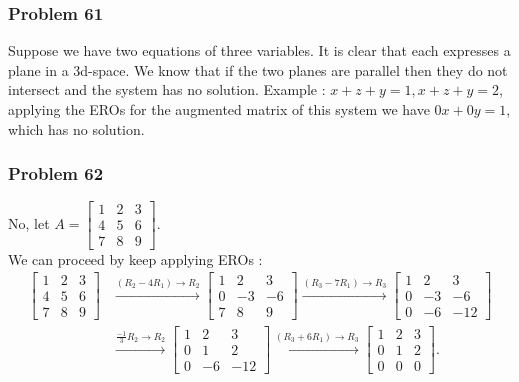 \documentclass[a4paper,12pt]{article}
\begin{document}
\subsubsection*{Problem 61}
Suppose we have two equations of three variables. It is clear that each expresses a plane in a 3d-space. We know that if the two planes are parallel then they do not intersect and the system has no solution. Example : $x+z+y=1, x+z+y=2$, applying the EROs for the augmented matrix of this system we have $0x+0y=1$, which has no solution.
\subsubsection*{Problem 62}
No, let $A=\begin{bmatrix}
  1 & 2 & 3 \\
  4 & 5 & 6 \\
  7 & 8 & 9
\end{bmatrix}.$\\
We can proceed by keep applying EROs :
\begin{align*}
  \begin{bmatrix}
    1 & 2 & 3 \\
    4 & 5 & 6 \\
    7 & 8 & 9
  \end{bmatrix} &\xrightarrow{{(R_2-4R_1)}	\to{R_2}}
  \begin{bmatrix}
    1 & 2 & 3 \\
    0 & -3 & -6 \\
    7 & 8 & 9
  \end{bmatrix} \xrightarrow{{(R_3-7R_1)}	\to{R_3}}
   \begin{bmatrix}
    1 & 2 & 3 \\
    0 & -3 & -6 \\
    0 & -6 & -12
  \end{bmatrix}\\ &\xrightarrow{{\frac{-1}{3}R_2}	\to{R_2}}  \begin{bmatrix}
    1 & 2 & 3 \\
    0 & 1 & 2 \\
    0 & -6 & -12
  \end{bmatrix} \xrightarrow{{(R_3+6R_1)}	\to{R_3}}
  \begin{bmatrix}
    1 & 2 & 3 \\
    0 & 1 & 2 \\
    0 & 0 & 0
  \end{bmatrix}.
\end{align*}\\
\end{document}
